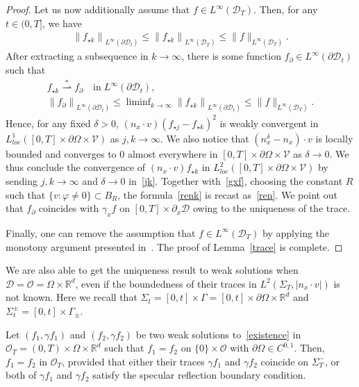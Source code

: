 \documentclass[10pt]{amsart}
\theoremstyle{definition}\newtheorem{defi}[theo]{Definition}\newtheorem{rema}[theo]{Remark}\newtheorem{exam}[theo]{Example}\newtheorem{exem}[theo]{Example}\newtheorem{nota}[theo]{Notation}
\newcommand*\p{\partial}
\newcommand*\R {\mathbb{R}}
\newcommand*\V {\mathcal{V}}
\newcommand*\D {\mathcal{D}}
\newcommand*\OO {\mathcal{O}}
\begin{document}
\begin{proof}
Let us now additionally assume that $f\in L^\infty(\D_T)$. Then, for any $t\in(0,T]$, we have
\begin{align*}
\left\|f_{\star k}\right\|_{L^\infty(\p\D_t)} \le \left\|f_{\star k}\right\|_{L^\infty(\D_T)} \le \|f\|_{L^\infty(\D_T)}.
\end{align*}
After extracting a subsequence in $k\rightarrow\infty$, there is some function $f_\p\in L^\infty(\p\D_t)$ such that
\begin{multline}\label{gxf}
f_{\star k}\stackrel{\ast}{\rightharpoonup}f_\p \quad \text{in}\; L^\infty(\p\D_t),\\
\left\|f_\p\right\|_{L^\infty(\p\D_t)}
\le \liminf\nolimits_{k\rightarrow\infty}\left\|f_{\star k}\right\|_{L^\infty(\p\D_t)}
\le \|f\|_{L^\infty(\D_T)}.
\end{multline}
Hence, for any fixed $\delta>0$, $(n_x\cdot v)(f_{\star j}-f_{\star k})^2$ is weakly convergent in $L_{loc}^1([0,T]\times\p\Omega\times\V)$ as $j,k\rightarrow\infty$. We also notice that $(n_x^\delta-n_x) \cdot v$ is locally bounded and converges to $0$ almost everywhere in $[0,T]\times\p\Omega\times\V$ as $\delta\rightarrow 0$. We thus conclude the convergence of $(n_x\cdot v)f_{\star k}$ in $L_{loc}^2([0,T]\times\p\Omega\times\V)$ by sending $j,k\rightarrow\infty$ and $\delta\rightarrow0$ in~\eqref{jk}. Together with~\eqref{gxf}, choosing the constant $R$ such that $\{v:\varphi\neq0\}\subset B_R$, the formula~\eqref{renk} is recast as~\eqref{ren}. We point out that $f_\p$ coincides with $\gamma_xf$ on $[0,T]\times\p_x\D$ owing to the uniqueness of the trace.

Finally, one can remove the assumption that $f\in L^\infty(\D_T)$ by applying the monotony argument presented in~\cite[Proof of Theorem~4.5]{Mischler3}. The proof of Lemma~\ref{trace} is complete.
\end{proof}

We are also able to get the uniqueness result to weak solutions when $\D=\OO=\Omega\times\R^d$, even if the boundedness of their traces in $L^2(\Sigma_T,|n_x\cdot v|)$ is not known. Here we recall that $\Sigma_t=[0,t]\times\Gamma=[0,t]\times\p\Omega\times\R^d$ and $\Sigma_t^\pm=[0,t]\times\Gamma_\pm$.

\begin{coro}[uniqueness]\label{unique}
Let $(f_1,\gamma f_1)$ and $(f_2,\gamma f_2)$ be two weak solutions to~\eqref{existence} in $\OO_T=(0,T)\times\Omega\times\R^d$ such that $f_1=f_2$ on $\{0\}\times\OO$ with $\p\Omega\in C^{0,1}$. Then, $f_1=f_2$ in $\OO_T$, provided that either their traces $\gamma f_1$ and $\gamma f_2$ coincide on $\Sigma_T^-$, or both of $\gamma f_1$ and $\gamma f_2$ satisfy the specular reflection boundary condition.
\end{coro}
\end{document}
